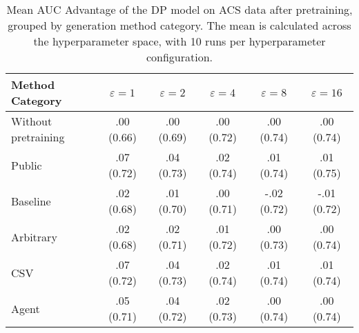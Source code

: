 \begin{table}[h!]
    \centering
    \caption{Mean AUC Advantage of the DP model on ACS data after pretraining, grouped by generation method category. The mean is calculated across the hyperparameter space, with 10 runs per hyperparameter configuration.}
    \label{tab:epsilon_comparison}
    \begin{tabular}{lccccc}
    \toprule
    Method Category & $\varepsilon=1$ & $\varepsilon=2$ & $\varepsilon=4$ & $\varepsilon=8$ & $\varepsilon=16$ \\
    \midrule
    Without pretraining & .00 {\small (0.66)} & .00 {\small (0.69)} & .00 {\small (0.72)} & .00 {\small (0.74)} & .00 {\small (0.74)} \\
    \arrayrulecolor{black!50!}\midrule
    Public & \cellcolor{silver!30}.07 {\small (0.72)} & \cellcolor{gold!30}.04 {\small (0.73)} & \cellcolor{gold!30}.02 {\small (0.74)} & \cellcolor{gold!30}.01 {\small (0.74)} & \cellcolor{gold!30}.01 {\small (0.75)} \\
    \arrayrulecolor{black!50!}\midrule
    Baseline & .02 {\small (0.68)} & .01 {\small (0.70)} & .00 {\small (0.71)} & -.02 {\small (0.72)} & -.01 {\small (0.72)} \\
    \arrayrulecolor{black!50!}\midrule
    Arbitrary & .02 {\small (0.68)} & \cellcolor{bronze!30}.02 {\small (0.71)} & .01 {\small (0.72)} & .00 {\small (0.73)} & .00 {\small (0.74)} \\
    \arrayrulecolor{black!50!}\midrule
    CSV & \cellcolor{gold!30}.07 {\small (0.72)} & \cellcolor{gold!30}.04 {\small (0.73)} & \cellcolor{silver!30}.02 {\small (0.74)} & \cellcolor{silver!30}.01 {\small (0.74)} & \cellcolor{silver!30}.01 {\small (0.74)} \\
    Agent & \cellcolor{bronze!30}.05 {\small (0.71)} & \cellcolor{silver!30}.04 {\small (0.72)} & \cellcolor{bronze!30}.02 {\small (0.73)} & \cellcolor{bronze!30}.00 {\small (0.74)} & \cellcolor{bronze!30}.00 {\small (0.74)} \\
    \bottomrule
    \end{tabular}
\end{table}